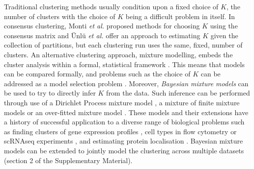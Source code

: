 \documentclass{bmcart}
\begin{document}
	Traditional clustering methods usually condition upon a fixed choice of $K$, the number of clusters with the choice of $K$ being a difficult problem in itself. In consensus clustering, Monti {\em et al.} \cite{monti2003consensus} proposed methods for choosing $K$ using the consensus matrix and {\"U}nl{\"u} {\em et al.} \cite{UnluEstimatingnumberclusters2019} offer an approach to estimating $K$ given the collection of partitions, but each clustering run uses the same, fixed, number of clusters. An alternative clustering approach, mixture modelling, embeds the cluster analysis within a formal, statistical framework \citep{fraley2002model}. This means that models can be compared formally, and problems such as the choice of $K$ can be addressed as a model selection problem \citep{FraleyHowManyClusters1998}. Moreover, \emph{Bayesian mixture models} can be used to try to directly infer $K$ from the data. Such inference can be performed through use of a Dirichlet Process mixture model \citep{ferguson1973bayesian, AntoniakMixturesDirichletProcesses1974}, a mixture of finite mixture models \citep{richardson1997bayesian, miller2018mixture} or an over-fitted mixture model \citep{rousseau2011asymptotic}. These models and their extensions have a history of successful application to a diverse range of biological problems such as finding clusters of gene expression profiles \citep{medvedovic2002bayesian}, cell types in flow cytometry \citep{chan2008statistical, hejblum2019sequential} or scRNAseq experiments \citep{prabhakaran2016dirichlet}, and estimating protein localisation \citep{crook2018bayesian}. Bayesian mixture models can be extended to jointly model the clustering across multiple datasets \citep{kirk2012bayesian, gabasova2017clusternomics} (section 2 of the Supplementary Material).
	
\end{document}
